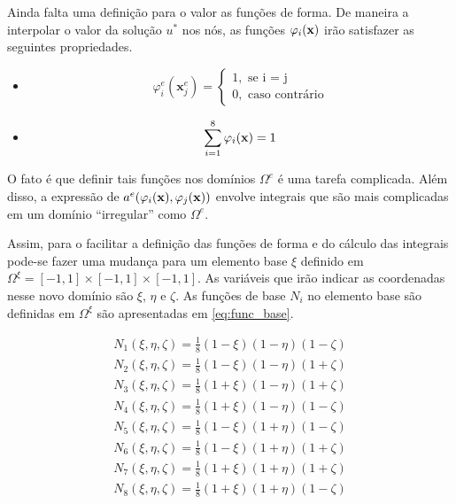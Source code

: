 Ainda falta uma definição para o valor as funções de forma. De maneira a interpolar o valor da solução $u^*$ nos nós, as funções $\varphi_i(\mathbf{x})$ irão satisfazer as seguintes propriedades.

\begin{itemize}
\item \begin{equation}\label{eq:func_cond1}
\varphi^e_i(\mathbf{x}^e_j) = \left\{\begin{matrix} 1, \text{ se i = j} \\  0, \text{ caso contrário} \end{matrix}\right.
\end{equation}
\item \begin{equation}\label{eq:func_cond2}
    \sum_{i=1}^8 \varphi_i(\mathbf{x}) = 1
\end{equation}
\end{itemize}


O fato é que definir tais funções nos domínios $\Omega^e$ é uma tarefa complicada. Além disso, a expressão de $a^e(\varphi_i(\mathbf{x}),\varphi_j(\mathbf{x}))$ envolve integrais que são mais complicadas em um domínio {\color{red}``irregular''} como $\Omega^e$.


Assim, para o facilitar a definição das funções de forma e do cálculo das integrais pode-se fazer uma mudança para um elemento base $\xi$ definido em $\Omega^\xi = [-1,1]\times[-1,1]\times[-1,1]$. As variáveis que irão indicar as coordenadas nesse novo domínio são $\xi$, $\eta$ e $\zeta$. As funções de base $N_i$ no elemento base são definidas em $\Omega^\xi$ são apresentadas em \ref{eq:func_base}.

\begin{equation}
\begin{matrix}\label{eq:func_base}
N_1(\xi, \eta, \zeta) = \frac{1}{8} (1-\xi)(1-\eta)(1-\zeta) \\
N_2(\xi, \eta, \zeta) = \frac{1}{8} (1-\xi)(1-\eta)(1+\zeta) \\
N_3(\xi, \eta, \zeta) = \frac{1}{8} (1+\xi)(1-\eta)(1+\zeta) \\
N_4(\xi, \eta, \zeta) = \frac{1}{8} (1+\xi)(1-\eta)(1-\zeta) \\
N_5(\xi, \eta, \zeta) = \frac{1}{8} (1-\xi)(1+\eta)(1-\zeta) \\
N_6(\xi, \eta, \zeta) = \frac{1}{8} (1-\xi)(1+\eta)(1+\zeta) \\
N_7(\xi, \eta, \zeta) = \frac{1}{8} (1+\xi)(1+\eta)(1+\zeta) \\
N_8(\xi, \eta, \zeta) = \frac{1}{8} (1+\xi)(1+\eta)(1-\zeta)
\end{matrix}
\end{equation}

